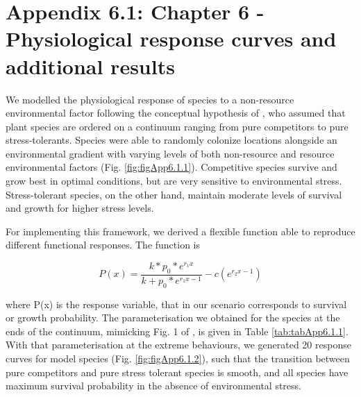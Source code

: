 \chapter[Appendix 6.1: Chapter 6 - Physiological response curves]{Appendix 6.1: Chapter 6 - Physiological response curves and additional results}\label{ch:environment_appendix}
\renewcommand{\thefigure}{A.6.1.\arabic{figure}}
\setcounter{figure}{0}

\renewcommand{\thetable}{A.6.1.\arabic{table}}
\setcounter{table}{0}

We modelled the physiological response of species to a non-resource environmental factor following the conceptual hypothesis of \cite{Maestre2009}, who assumed that plant species are ordered on a continuum ranging from pure competitors to pure stress-tolerants. Species were able to randomly colonize locations alongside an environmental gradient with varying levels of both non-resource and resource environmental factors (Fig. \ref{fig:figApp6.1.1}). Competitive species survive and grow best in optimal conditions, but are very sensitive to environmental stress. Stress-tolerant species, on the other hand, maintain moderate levels of survival and growth for higher stress levels.

For implementing this framework, we derived a flexible function able to reproduce different functional responses. The function is

\begin{equation} \label{eq:eqApp6.1.1}
P(x) = \frac{k * p_0 * e^{r_1 x}}{k + p_0 * e^{r_1 x -1}} - c(e^{r_2 x -1})
\end{equation}

where P(x) is the response variable, that in our scenario corresponds to survival or growth probability. The parameterisation we obtained for the species at the ends of the continuum, mimicking Fig. 1 of \cite{Maestre2009}, is given in Table \ref{tab:tabApp6.1.1}. With that parameterisation at the extreme behaviours, we generated 20 response curves for model species (Fig. \ref{fig:figApp6.1.2}), such that the transition between pure competitors and pure stress tolerant species is smooth, and all species have maximum survival probability in the absence of environmental stress.

